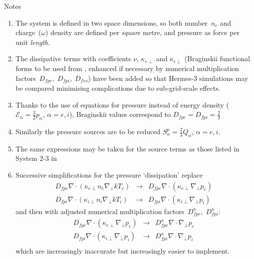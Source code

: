 Notes
\begin{enumerate}
\item The system is defined in two space dimensions, so both number~$n_e$ and charge~($\omega$) density
are defined per \emph{square} metre, and pressure as force per unit \emph{length}.
\item The dissipative terms with coefficients $\nu$, $\kappa_{e\perp}$ and $\kappa_{i\perp}$ (Braginskii
functional forms to be used from , enhanced if necessary by numerical multiplication
factors~$D_{fpe},\;D_{fpi},\;D_{fvs}$) have been added so that Hermes-3 simulations
may be compared minimising complications due to sub-grid-scale effects.
\item Thanks to the use of equations for pressure instead of energy density ($\mathcal{E}_\alpha= \frac{3}{2}p_\alpha$,
$\alpha=e,i$),
Braginskii values correspond to $D_{fpe}=D_{fpi}=\frac{2}{3}$
\item Similarly the pressure sources are to be reduced $S^p_\alpha=\frac{2}{3} Q_\alpha$, $\alpha=e,i$.
\item The same expressions  may be taken for the source terms as those listed in System 2-3 in ~
\item Successive simplifications for the pressure `dissipation' replace
\begin{eqnarray}
D_{fpe}\nabla \cdot \left( {\kappa_{e\perp}} n_e \nabla_\perp kT_e \right) &\rightarrow& D_{fpe}\nabla \cdot \left( {\kappa_{e\perp}} \nabla_\perp p_e \right) \\
D_{fpi}\nabla \cdot \left( {\kappa_{i\perp}} n_i \nabla_\perp kT_i \right) &\rightarrow& D_{fpi}\nabla \cdot \left( {\kappa_{i\perp}} \nabla_\perp p_i \right) 
\end{eqnarray}
and then with adjusted numerical multiplication factors~$D^{\kappa}_{fpe},\;D^{\kappa}_{fpi}$:
\begin{eqnarray}
D_{fpe}\nabla \cdot \left( {\kappa_{e\perp}} \nabla_\perp p_e \right) &\rightarrow& D^{\kappa}_{fpe}\nabla \cdot \nabla_\perp p_e \\
D_{fpi}\nabla \cdot \left( {\kappa_{i\perp}} \nabla_\perp p_i \right) &\rightarrow& D^{\kappa}_{fpi}\nabla \cdot \nabla_\perp p_i \\
\end{eqnarray}
which are increasingly inaccurate but increasingly easier to implement. 
\end{enumerate}

